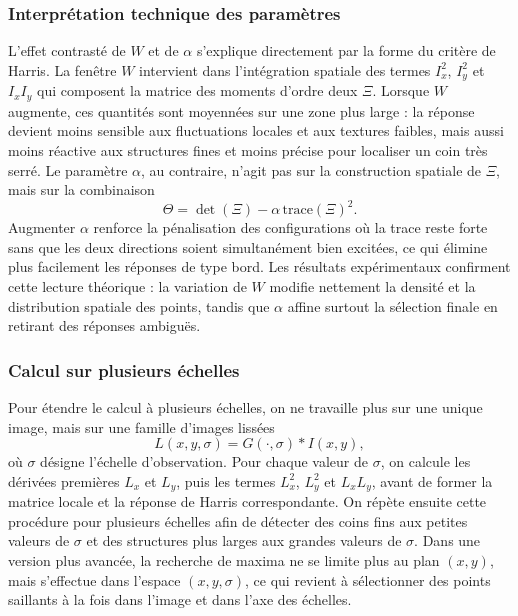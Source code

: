 \documentclass[11pt,a4paper]{article}
\begin{document}
\subsubsection{Interprétation technique des paramètres}
L'effet contrasté de \(W\) et de \(\alpha\) s'explique directement par la forme du critère de Harris. La fenêtre \(W\) intervient dans l'intégration spatiale des termes \(I_x^2\), \(I_y^2\) et \(I_xI_y\) qui composent la matrice des moments d'ordre deux \(\Xi\). Lorsque \(W\) augmente, ces quantités sont moyennées sur une zone plus large : la réponse devient moins sensible aux fluctuations locales et aux textures faibles, mais aussi moins réactive aux structures fines et moins précise pour localiser un coin très serré. Le paramètre \(\alpha\), au contraire, n'agit pas sur la construction spatiale de \(\Xi\), mais sur la combinaison
\[
\Theta = \det(\Xi) - \alpha\,\mathrm{trace}(\Xi)^2.
\]
Augmenter \(\alpha\) renforce la pénalisation des configurations où la trace reste forte sans que les deux directions soient simultanément bien excitées, ce qui élimine plus facilement les réponses de type bord. Les résultats expérimentaux confirment cette lecture théorique : la variation de \(W\) modifie nettement la densité et la distribution spatiale des points, tandis que \(\alpha\) affine surtout la sélection finale en retirant des réponses ambiguës.

\subsubsection{Calcul sur plusieurs échelles}
Pour étendre le calcul à plusieurs échelles, on ne travaille plus sur une unique image, mais sur une famille d'images lissées
\[
L(x,y,\sigma)=G(\cdot,\sigma)\ast I(x,y),
\]
où \(\sigma\) désigne l'échelle d'observation. Pour chaque valeur de \(\sigma\), on calcule les dérivées premières \(L_x\) et \(L_y\), puis les termes \(L_x^2\), \(L_y^2\) et \(L_xL_y\), avant de former la matrice locale et la réponse de Harris correspondante. On répète ensuite cette procédure pour plusieurs échelles afin de détecter des coins fins aux petites valeurs de \(\sigma\) et des structures plus larges aux grandes valeurs de \(\sigma\). Dans une version plus avancée, la recherche de maxima ne se limite plus au plan \((x,y)\), mais s'effectue dans l'espace \((x,y,\sigma)\), ce qui revient à sélectionner des points saillants à la fois dans l'image et dans l'axe des échelles.
\end{document}
